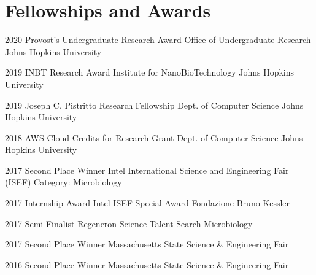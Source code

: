 \section{Fellowships and Awards}

\cventry
{2020}
{Provost's Undergraduate Research Award}
{Office of Undergraduate Research}
{Johns Hopkins University}
{}
{}

\cventry
{2019}
{INBT Research Award}
{Institute for NanoBioTechnology}
{Johns Hopkins University}
{}
{}%

\cventry
{2019}
{Joseph C. Pistritto Research Fellowship}
{Dept. of Computer Science}
{Johns Hopkins University}
{}
{}%

\cventry
{2018}
{AWS Cloud Credits for Research Grant}
{Dept. of Computer Science}
{Johns Hopkins University}
{}
{} %

\cventry
{2017}
{Second Place Winner}
{Intel International Science and Engineering Fair (ISEF)}
{Category: Microbiology}
{}
{} %

\cventry
{2017}
{Internship Award}
{Intel ISEF Special Award}
{Fondazione Bruno Kessler}
{}
{} %

\cventry
{2017}
{Semi-Finalist}
{Regeneron Science Talent Search}
{Microbiology}
{}
{} %

\cventry
{2017}
{Second Place Winner}
{Massachusetts State Science \& Engineering Fair}
{}
{}
{} %

\cventry
{2016}
{Second Place Winner}
{Massachusetts State Science \& Engineering Fair}
{}
{}
{} %